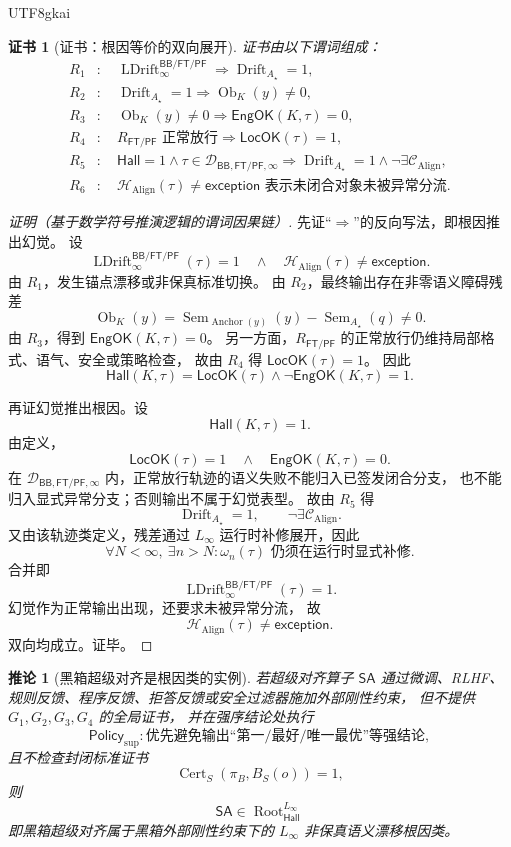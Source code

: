 \documentclass[12pt]{article}
\newtheorem{corollary}{推论}[section]
\newtheorem{Certificate}{证书}[section]
\newcommand{\Linfty}{\ensuremath{L_\infty}}
\newcommand{\Policy}{\mathsf{Policy}}
\newcommand{\LocOK}{\mathsf{LocOK}}
\newcommand{\EngOK}{\mathsf{EngOK}}
\newcommand{\Hall}{\mathsf{Hall}}
\newcommand{\Exc}{\mathsf{exception}}
\newcommand{\FTPF}{\mathsf{FT/PF}}
\newcommand{\BB}{\mathsf{BB}}
\newcommand{\SA}{\mathsf{SA}}
\newcommand{\Sem}{\operatorname{Sem}}
\newcommand{\Align}{\operatorname{Align}}
\newcommand{\Anchor}{\operatorname{Anchor}}
\newcommand{\Cert}{\operatorname{Cert}}
\newcommand{\Ob}{\operatorname{Ob}}
\newcommand{\Drift}{\operatorname{Drift}}
\newcommand{\LDrift}{\operatorname{LDrift}}
\newcommand{\Root}{\operatorname{Root}}
\begin{document}
\begin{CJK*}{UTF8}{gkai}
\begin{Certificate}[证书：根因等价的双向展开]
\label{cert:tex51-bb-ftpf-root}
证书由以下谓词组成：
\[
\begin{aligned}
  R_1&:\quad \LDrift_{\infty}^{\BB/\FTPF}\Rightarrow \Drift_{A_\star}=1,\\
  R_2&:\quad \Drift_{A_\star}=1\Rightarrow \Ob_K(y)\ne 0,\\
  R_3&:\quad \Ob_K(y)\ne 0\Rightarrow \EngOK(K,\tau)=0,\\
  R_4&:\quad R_{\FTPF}\text{ 正常放行}\Rightarrow \LocOK(\tau)=1,\\
  R_5&:\quad \Hall=1\wedge \tau\in\mathcal D_{\BB,\FTPF,\infty}
       \Rightarrow \Drift_{A_\star}=1\wedge\neg\exists\mathcal C_{\Align},\\
  R_6&:\quad \mathcal H_{\Align}(\tau)\ne\Exc
       \text{ 表示未闭合对象未被异常分流}.
\end{aligned}
\]
\end{Certificate}

\begin{proof}[证明（基于数学符号推演逻辑的谓词因果链）]
先证“\(\Rightarrow\)”的反向写法，即根因推出幻觉。
设
\[
  \LDrift_{\infty}^{\BB/\FTPF}(\tau)=1
  \quad\wedge\quad
  \mathcal H_{\Align}(\tau)\ne\Exc.
\]
由 \(R_1\)，发生锚点漂移或非保真标准切换。
由 \(R_2\)，最终输出存在非零语义障碍残差
\[
  \Ob_K(y)
  =
  \Sem_{\Anchor(y)}(y)-\Sem_{A_\star}(q)
  \ne 0.
\]
由 \(R_3\)，得到 \(\EngOK(K,\tau)=0\)。
另一方面，\(R_{\FTPF}\) 的正常放行仍维持局部格式、语气、安全或策略检查，
故由 \(R_4\) 得 \(\LocOK(\tau)=1\)。
因此
\[
  \Hall(K,\tau)=
  \LocOK(\tau)\wedge\neg\EngOK(K,\tau)
  =1.
\]

再证幻觉推出根因。设
\[
  \Hall(K,\tau)=1.
\]
由定义，
\[
  \LocOK(\tau)=1
  \quad\wedge\quad
  \EngOK(K,\tau)=0.
\]
在 \(\mathcal D_{\BB,\FTPF,\infty}\) 内，正常放行轨迹的语义失败不能归入已签发闭合分支，
也不能归入显式异常分支；否则输出不属于幻觉表型。
故由 \(R_5\) 得
\[
  \Drift_{A_\star}=1,
  \qquad
  \neg\exists\mathcal C_{\Align}.
\]
又由该轨迹类定义，残差通过 \(\Linfty\) 运行时补修展开，因此
\[
  \forall N<\infty,\ \exists n>N:
  \omega_n(\tau)\text{ 仍须在运行时显式补修}.
\]
合并即
\[
  \LDrift_{\infty}^{\BB/\FTPF}(\tau)=1.
\]
幻觉作为正常输出出现，还要求未被异常分流，
故
\[
  \mathcal H_{\Align}(\tau)\ne\Exc.
\]
双向均成立。证毕。
\end{proof}

\begin{corollary}[黑箱超级对齐是根因类的实例]
\label{cor:tex51-bb-superalignment-instance}
若超级对齐算子 \(\SA\) 通过微调、RLHF、规则反馈、程序反馈、拒答反馈或安全过滤器施加外部刚性约束，
但不提供 \(G_1,G_2,G_3,G_4\) 的全局证书，
并在强序结论处执行
\[
  \Policy_{\mathrm{sup}}:
  \text{优先避免输出“第一/最好/唯一最优”等强结论},
\]
且不检查封闭标准证书
\[
  \Cert_S(\pi_B,B_S(o))=1,
\]
则
\[
  \SA\in \Root_{\Hall}^{\Linfty}
\]
即黑箱超级对齐属于黑箱外部刚性约束下的 \(\Linfty\) 非保真语义漂移根因类。
\end{corollary}


\end{CJK*}
\end{document}
